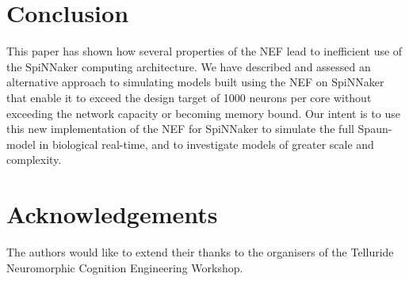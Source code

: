 \documentclass[conference]{IEEEtran}
\begin{document}
  \section{Conclusion}

  This paper has shown how several properties of the NEF lead to inefficient use of the SpiNNaker computing architecture.
  We have described and assessed an alternative approach to simulating models built using the NEF on SpiNNaker that enable it to exceed the design target of 1000 neurons per core without exceeding the network capacity or becoming memory bound.
  Our intent is to use this new implementation of the NEF for SpiNNaker to simulate the full Spaun-model in biological real-time, and to investigate models of greater scale and complexity.

  \section*{Acknowledgements}

The authors would like to extend their thanks to the organisers of the Telluride Neuromorphic Cognition Engineering Workshop.

  \printbibliography
\end{document}
